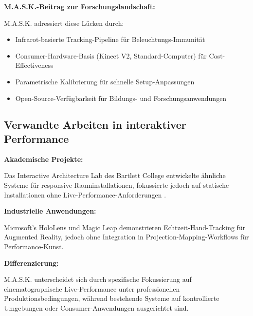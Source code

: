 \textbf{M.A.S.K.-Beitrag zur Forschungslandschaft:}

M.A.S.K. adressiert diese Lücken durch:
\begin{itemize}
    \item Infrarot-basierte Tracking-Pipeline für Beleuchtungs-Immunität
    \item Consumer-Hardware-Basis (Kinect V2, Standard-Computer) für Cost-Effectiveness
    \item Parametrische Kalibrierung für schnelle Setup-Anpassungen
    \item Open-Source-Verfügbarkeit für Bildungs- und Forschungsanwendungen
\end{itemize}

\subsection{Verwandte Arbeiten in interaktiver Performance}

\textbf{Akademische Projekte:}

Das Interactive Architecture Lab des Bartlett College entwickelte ähnliche Systeme für responsive Rauminstallationen, fokussierte jedoch auf statische Installationen ohne Live-Performance-Anforderungen \cite{achten2011interactive}.

\textbf{Industrielle Anwendungen:}

Microsoft's HoloLens und Magic Leap demonstrieren Echtzeit-Hand-Tracking für Augmented Reality, jedoch ohne Integration in Projection-Mapping-Workflows für Performance-Kunst.

\textbf{Differenzierung:}

M.A.S.K. unterscheidet sich durch spezifische Fokussierung auf cinematographische Live-Performance unter professionellen Produktionsbedingungen, während bestehende Systeme auf kontrollierte Umgebungen oder Consumer-Anwendungen ausgerichtet sind.